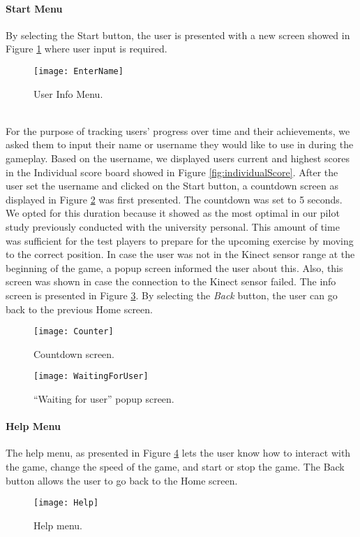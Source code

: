 \paragraph{Start Menu}
By selecting the Start button, the user is presented with a new screen showed in Figure \ref{fig:userinfo} where user input is required.\\
\begin{figure}[h]
    \centering
    \texttt{[image: EnterName]}
    \caption{User Info Menu.}
    \label{fig:userinfo}
\end{figure}\\
For the purpose of tracking users' progress over time and their achievements, we asked them to input their name or username they would like to use in during the gameplay. Based on the username, we displayed users current and highest scores in the Individual score board showed in Figure \ref{fig:individualScore}. After the user set the username and clicked on the Start button, a countdown screen as displayed in Figure \ref{fig:counter} was first presented. The countdown was set to 5 seconds. We opted for this duration because it showed as the most optimal in our pilot study previously conducted with the university personal. This amount of time was sufficient for the test players to prepare for the upcoming exercise by moving to the correct position. In case the user was not in the Kinect sensor range at the beginning of the game, a popup screen informed the user about this. Also, this screen was shown in case the connection to the Kinect sensor failed. The info screen is presented in Figure \ref{fig:witing}. By selecting the \textit{Back} button, the user can go back to the previous Home screen.\pagebreak
\begin{figure}[h]
    \centering
    \texttt{[image: Counter]}
    \caption{Countdown screen.}
    \label{fig:counter}
\end{figure}
\begin{figure}[h]
    \centering
    \texttt{[image: WaitingForUser]}
    \caption{``Waiting for user'' popup screen.}
    \label{fig:witing}
\end{figure}
   
\paragraph{Help Menu}
The help menu, as presented in Figure \ref{fig:help} lets the user know how to interact with the game, change the speed of the game, and start or stop the game. The Back button allows the user to go back to the Home screen.\\ 
\begin{figure}[h]
    \centering
    \texttt{[image: Help]}
    \caption{Help menu.}
    \label{fig:help}
\end{figure}
